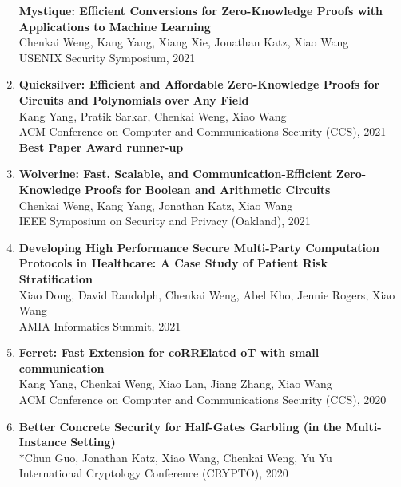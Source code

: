 \documentclass[letterpaper,11pt]{article}
\begin{document}
\begin{enumerate}[leftmargin=0.20in]
    {\textbf{\small Mystique: Efficient Conversions for Zero-Knowledge Proofs with Applications to Machine Learning}} \\
		{\small Chenkai Weng, Kang Yang, Xiang Xie, Jonathan Katz, Xiao Wang \vspace{-2pt}} \\
		{\small USENIX Security Symposium, 2021}
  \item
	  {\textbf{\small Quicksilver: Efficient and Affordable Zero-Knowledge Proofs for Circuits and Polynomials over Any Field}} \\
		{\small Kang Yang, Pratik Sarkar, Chenkai Weng, Xiao Wang \vspace{-2pt}} \\
		{\small ACM Conference on Computer and Communications Security (CCS), 2021} \\
    {\small \textbf{Best Paper Award runner-up}}
  \item
    {\textbf{\small Wolverine: Fast, Scalable, and Communication-Efficient Zero-Knowledge Proofs for Boolean and Arithmetic Circuits}} \\
		{\small Chenkai Weng, Kang Yang, Jonathan Katz, Xiao Wang \vspace{-2pt}} \\
		{\small IEEE Symposium on Security and Privacy (Oakland), 2021}
  \item
          {\textbf{\small Developing High Performance Secure Multi-Party Computation Protocols in Healthcare: A Case Study of Patient Risk Stratification}} \\
		{\small Xiao Dong, David Randolph, Chenkai Weng, Abel Kho, Jennie Rogers, Xiao Wang \vspace{-2pt}} \\
		{\small AMIA Informatics Summit, 2021}
  \item
          {\textbf{\small Ferret: Fast Extension for coRRElated oT with small communication}} \\
		{\small Kang Yang, Chenkai Weng, Xiao Lan, Jiang Zhang, Xiao Wang\vspace{-2pt}} \\
		{\small ACM Conference on Computer and Communications Security (CCS), 2020}
  \item
          {\textbf{\small Better Concrete Security for Half-Gates Garbling (in the Multi-Instance Setting)}} \\
		$\ast${\small Chun Guo, Jonathan Katz, Xiao Wang, Chenkai Weng, Yu Yu\vspace{-2pt}} \\ 
		{\small International Cryptology Conference (CRYPTO), 2020}
\end{enumerate}
\end{document}
